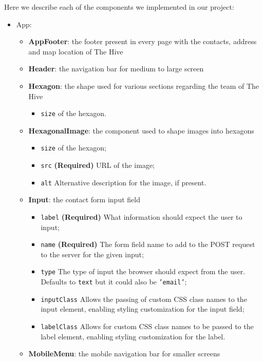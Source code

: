 Here we describe each of the components we implemented in our project:
\begin{itemize}
    \item App:
    \begin{itemize}
        \item \textbf{AppFooter}: the footer present in every page with the contacts, address and map location of The Hive
        \item \textbf{Header}: the navigation bar for medium to large screen
        \item \textbf{Hexagon}: the shape used for various sections regarding the team of The Hive
        \begin{itemize}
            \item \texttt{size} of the hexagon.
        \end{itemize}
        \item \textbf{HexagonalImage}: the component used to shape images into hexagons
        \begin{itemize}
            \item \texttt{size} of the hexagon;
            \item \texttt{src} \textbf{(Required)} URL of the image;
            \item \texttt{alt} Alternative description for the image, if present.
        \end{itemize}
        \item \textbf{Input}: the contact form input field
        \begin{itemize}
            \item \texttt{label} \textbf{(Required)} What information should expect the user to input;
            \item \texttt{name} \textbf{(Required)} The form field name to add to the POST request to the server for the given input;
            \item \texttt{type} The type of input the browser should expect from the user. Defaults to \texttt{text} but it could also be \texttt{'email'};
            \item \texttt{inputClass} Allows the passing of custom CSS class names to the input element, enabling styling customization for the input field;
            \item \texttt{labelClass} Allows for custom CSS class names to be passed to the label element, enabling styling customization for the label.
        \end{itemize}
        \item \textbf{MobileMenu}: the mobile navigation bar for smaller screens

\end{itemize}
\end{itemize}
